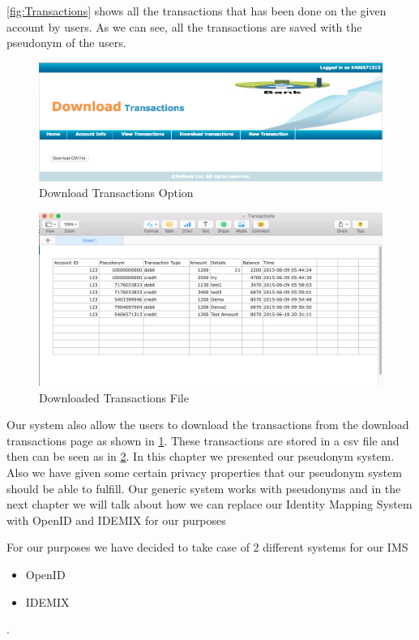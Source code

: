 \ref{fig:Transactions} shows all the transactions that has been done on the given account by users. As we can see, all the transactions are saved with the pseudonym of the users.
\begin{figure}[h]
	\centering
	\includegraphics[width=\textwidth]{figures/Download}
	\caption{Download Transactions Option}
	\label{fig:Download}
\end{figure}
\begin{figure}[h]
	\centering
	\includegraphics[width=\textwidth]{figures/File}
	\caption{Downloaded Transactions File}
	\label{fig:File}
\end{figure}	
Our system also allow the users to download the transactions from the download transactions page as shown in \ref{fig:Download}. These transactions are stored in a csv file and then can be seen as in \ref{fig:File}.
\FloatBarrier
In this chapter we presented our pseudonym system. Also we have given some certain privacy properties that our pseudonym system should be able to fulfill. Our generic system works with pseudonyms and in the next chapter we will talk about how we can replace our Identity Mapping System with OpenID and IDEMIX for our purposes

For our purposes we have decided to take case of 2 different systems for our IMS
\begin{itemize}
	\item OpenID
	\item IDEMIX
\end{itemize}.